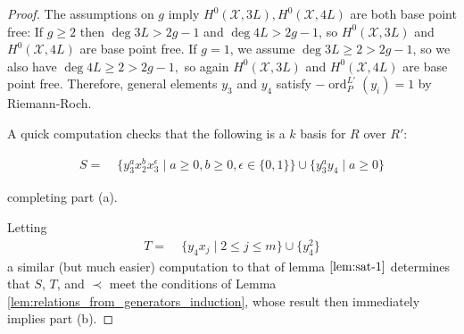 \documentclass{amsart}
\theoremstyle{plain}
\theoremstyle{definition}
\theoremstyle{remark}
\numberwithin{equation}{section}
\newcommand \sx{\mathscr X}
\DeclareMathOperator{\ord}{ord}
\newcommand \halfcan{L}
\newcommand \initial{\text{in}}
\begin{document}
\begin{proof}
The assumptions on $g$ imply $H^0(\sx, 3L), H^0(\sx, 4L)$ are both base point free: If $g \geq 2$ then $\deg 3L > 2g - 1$ and $\deg 4L > 2g - 1$, so $H^0(\sx, 3L)$ and $H^0(\sx, 4L)$ are base point free. If $g = 1$, we assume $\deg 3L \geq 2 > 2g - 1$, so we also have $\deg 4L \geq 2 > 2g - 1,$ so again $H^0(\sx, 3L)$ and $H^0(\sx, 4L)$ are base point free. Therefore, general elements $y_3$ and $y_4$ satisfy $-\ord_P^{\halfcan'}(y_i) = 1$ by Riemann-Roch.  

A quick computation checks that
the following is a $k$ basis for $R$ over $R'$:

\begin{align}
\label{eqn:sat_two_add_generator}
	S =	& \; \{ y_3^ax_2^b x_3^\epsilon \mid a \geq 0, b 
		\geq 0, \epsilon \in \{0, 1\}\} \cup \{ y_3^ay_4 \mid a \geq 0 \}
\end{align}

\noindent
completing part (a).

Letting
\begin{align*}
	T =   &\; \{ y_4 x_j \mid 2 \leq j \leq m \}\cup \{ y_4^2 \}
\end{align*}
a similar (but much easier) computation to that of lemma $\ref{lem:sat-1}$ determines that $S$, $T$, and $\prec$ meet the conditions of Lemma \ref{lem:relations_from_generators_induction}, whose result then immediately implies part (b).



\end{proof}
\end{document}
